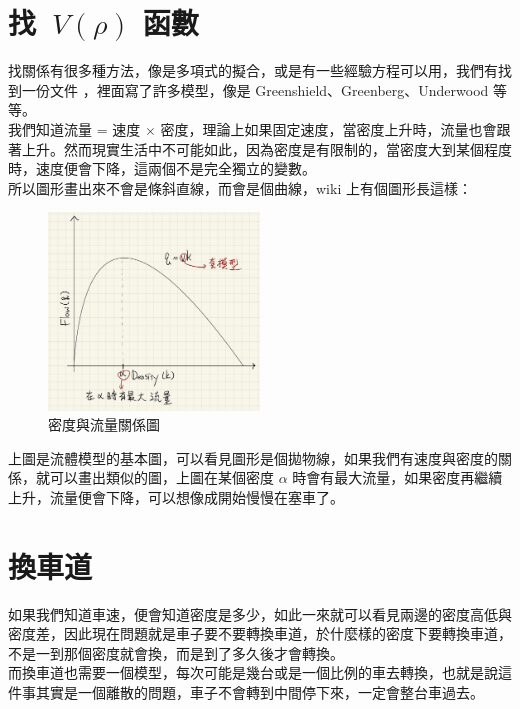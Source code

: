\documentclass[a4paper, 11pt]{report}
\begin{document}
\section{找\ $V({\rho})$ 函數}

找關係有很多種方法，像是多項式的擬合，或是有一些經驗方程可以用，我們有找到一份文件 \cite{traffic2016research}，裡面寫了許多模型，像是 Greenshield、Greenberg、Underwood 等等。\\

我們知道流量 = 速度 $\times$ 密度，理論上如果固定速度，當密度上升時，流量也會跟著上升。然而現實生活中不可能如此，因為密度是有限制的，當密度大到某個程度時，速度便會下降，這兩個不是完全獨立的變數。\\

所以圖形畫出來不會是條斜直線，而會是個曲線，wiki 上有個圖形長這樣：

\begin{figure}[h] 
\centering 
\includegraphics[width=0.5\textwidth]{11-3} 
\caption{密度與流量關係圖}
\label{Fig.main2} 
\end{figure}

上圖是流體模型的基本圖，可以看見圖形是個拋物線，如果我們有速度與密度的關係，就可以畫出類似的圖，上圖在某個密度 $\alpha$ 時會有最大流量，如果密度再繼續上升，流量便會下降，可以想像成開始慢慢在塞車了。

\section{換車道}

如果我們知道車速，便會知道密度是多少，如此一來就可以看見兩邊的密度高低與密度差，因此現在問題就是車子要不要轉換車道，於什麼樣的密度下要轉換車道，不是一到那個密度就會換，而是到了多久後才會轉換。\\

而換車道也需要一個模型，每次可能是幾台或是一個比例的車去轉換，也就是說這件事其實是一個離散的問題，車子不會轉到中間停下來，一定會整台車過去。\\
\end{document}
